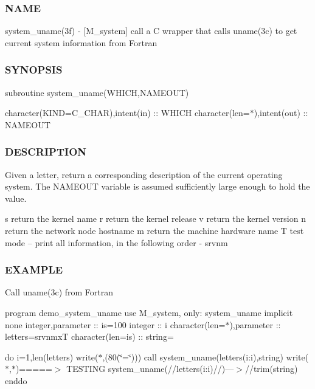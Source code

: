 \subsubsection*{N\+A\+ME}

system\+\_\+uname(3f) -\/ \mbox{[}M\+\_\+system\mbox{]} call a C wrapper that calls uname(3c) to get current system information from Fortran \subsubsection*{S\+Y\+N\+O\+P\+S\+IS}

subroutine system\+\_\+uname(\+W\+H\+I\+C\+H,\+N\+A\+M\+E\+O\+U\+T)

character(K\+I\+ND=C\+\_\+\+C\+H\+AR),intent(in) \+:\+: W\+H\+I\+CH character(len=$\ast$),intent(out) \+:\+: N\+A\+M\+E\+O\+UT \subsubsection*{D\+E\+S\+C\+R\+I\+P\+T\+I\+ON}

Given a letter, return a corresponding description of the current operating system. The N\+A\+M\+E\+O\+UT variable is assumed sufficiently large enough to hold the value.

s return the kernel name r return the kernel release v return the kernel version n return the network node hostname m return the machine hardware name T test mode -- print all information, in the following order -\/ srvnm

\subsubsection*{E\+X\+A\+M\+P\+LE}

Call uname(3c) from Fortran

program demo\+\_\+system\+\_\+uname use M\+\_\+system, only\+: system\+\_\+uname implicit none integer,parameter \+:\+: is=100 integer \+:\+: i character(len=$\ast$),parameter \+:\+: letters=\textquotesingle{}srvnmxT\textquotesingle{} character(len=is) \+:\+: string=\textquotesingle{} \textquotesingle{}

do i=1,len(letters) write($\ast$,\textquotesingle{}(80(\char`\"{}=\char`\"{}))\textquotesingle{}) call system\+\_\+uname(letters(i\+:i),string) write($\ast$,$\ast$)\textquotesingle{}=====$>$ T\+E\+S\+T\+I\+NG system\+\_\+uname(\textquotesingle{}//letters(i\+:i)//\textquotesingle{})---$>$\textquotesingle{}//trim(string) enddo

